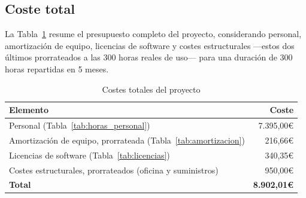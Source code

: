 \subsection{Coste total}

La Tabla~\ref{tab:costes_totales} resume el presupuesto completo del proyecto, considerando personal, amortización de equipo, licencias de software y costes estructurales —estos dos últimos prorrateados a las 300 horas reales de uso— para una duración de 300 horas repartidas en 5 meses.

\begin{table}[ht!]
\centering
\begin{tabular}{|l|r|}
\hline
\textbf{Elemento} & \textbf{Coste} \\
\hline
Personal (Tabla~\ref{tab:horas_personal}) & 7.395,00€ \\
\hline
Amortización de equipo, prorrateada (Tabla~\ref{tab:amortizacion}) & 216,66€ \\
\hline
Licencias de software (Tabla~\ref{tab:licencias}) & 340,35€ \\
\hline
Costes estructurales, prorrateados (oficina y suministros) & 950,00€ \\
\hline
\textbf{Total} & \textbf{8.902,01€} \\
\hline
\end{tabular}
\caption{Costes totales del proyecto}
\label{tab:costes_totales}
\end{table}
